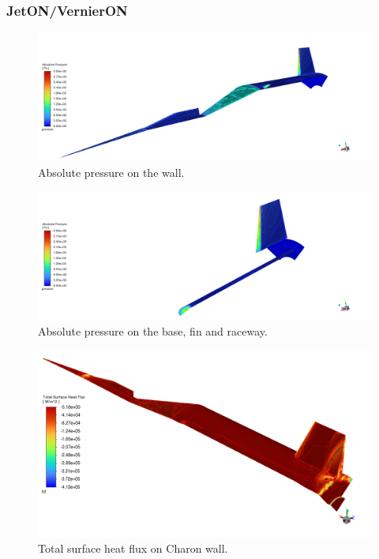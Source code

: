 \documentclass[12pt]{article}
\begin{document}
\subsubsection{JetON/VernierON}

\begin{figure}[H]
    \centering
    \includegraphics[width=\linewidth]{figs/t136s/Pabs_wall.png}
    \caption{Absolute pressure on the wall.}
    \label{fig:t136s_base_fin_raceway_pabs}
\end{figure}

\begin{figure}[H]
    \centering
    \includegraphics[width=\linewidth]{figs/t136s/Pabs_base_fin_raceway.png}
        \caption{Absolute pressure on the base, fin and raceway.}
    \label{fig:t136s_base_fin_raceway_pabs}
\end{figure}

\begin{figure}[H] %
    \centering
    \includegraphics[width=\linewidth]{figs/t136s/t136s_M5p26_jetONVernierON_FULL-HF.png}
    \caption{Total surface heat flux on Charon wall.}
    \label{fig:t136s_hf_onon}
\end{figure}
\end{document}
